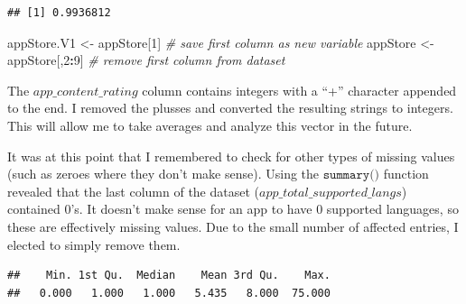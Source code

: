 \documentclass[]{article}
\newenvironment{Shaded}{\begin{snugshade}}{\end{snugshade}}
\newcommand{\CharTok}[1]{\textcolor[rgb]{0.31,0.60,0.02}{#1}}
\newcommand{\CommentTok}[1]{\textcolor[rgb]{0.56,0.35,0.01}{\textit{#1}}}
\newcommand{\DecValTok}[1]{\textcolor[rgb]{0.00,0.00,0.81}{#1}}
\newcommand{\KeywordTok}[1]{\textcolor[rgb]{0.13,0.29,0.53}{\textbf{#1}}}
\newcommand{\NormalTok}[1]{#1}
\newcommand{\OperatorTok}[1]{\textcolor[rgb]{0.81,0.36,0.00}{\textbf{#1}}}
\newcommand{\StringTok}[1]{\textcolor[rgb]{0.31,0.60,0.02}{#1}}
\begin{document}
\begin{verbatim}
## [1] 0.9936812
\end{verbatim}

\begin{Shaded}
\begin{Highlighting}[]
\NormalTok{appStore.V1 <-}\StringTok{ }\NormalTok{appStore[}\DecValTok{1}\NormalTok{]                }\CommentTok{# save first column as new variable}
\NormalTok{appStore <-}\StringTok{ }\NormalTok{appStore[,}\DecValTok{2}\OperatorTok{:}\DecValTok{9}\NormalTok{]                }\CommentTok{# remove first column from dataset}
\end{Highlighting}
\end{Shaded}

The \(\textit{app\_content\_rating}\) column contains integers with a
``+'' character appended to the end. I removed the plusses and converted
the resulting strings to integers. This will allow me to take averages
and analyze this vector in the future.

\begin{Shaded}
\end{Shaded}

It was at this point that I remembered to check for other types of
missing values (such as zeroes where they don't make sense). Using the
\(\texttt{summary()}\) function revealed that the last column of the
dataset (\(\textit{app\_total\_supported\_langs}\)) contained 0's. It
doesn't make sense for an app to have 0 supported languages, so these
are effectively missing values. Due to the small number of affected
entries, I elected to simply remove them.

\begin{Shaded}
\end{Shaded}

\begin{verbatim}
##    Min. 1st Qu.  Median    Mean 3rd Qu.    Max. 
##   0.000   1.000   1.000   5.435   8.000  75.000
\end{verbatim}
\end{document}
